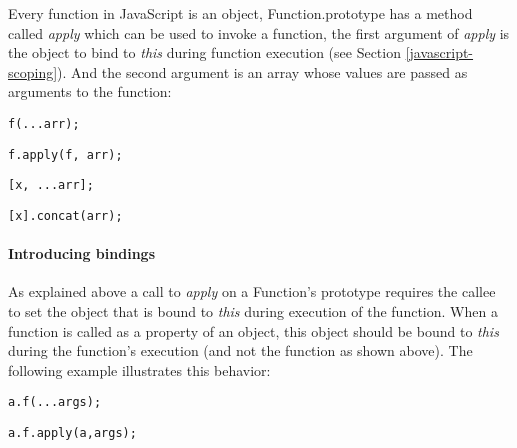 
Every function in JavaScript is an object, Function.prototype has a method called \textit{apply} which can be used to invoke a function, the first argument of \textit{apply} is the object to bind to \textit{this} during function execution (see Section \ref{javascript-scoping}). And the second argument is an array whose values are passed as arguments to the function:

\begin{minipage}{0.45\textwidth}
\begin{lstlisting}
f(...arr);
\end{lstlisting}
\end{minipage}
\hfill
\begin{minipage}{0.45\textwidth}
\begin{lstlisting}
f.apply(f, arr);
\end{lstlisting}
\end{minipage}

\begin{minipage}{0.45\textwidth}
\begin{lstlisting}
[x, ...arr];
\end{lstlisting}
\end{minipage}
\hfill
\begin{minipage}{0.45\textwidth}
\begin{lstlisting}
[x].concat(arr);
\end{lstlisting}
\end{minipage}

\paragraph{Introducing bindings} \label{spread-intoducing-bindings}
As explained above a call to \textit{apply} on a Function's prototype requires the callee to set the object that is bound to \textit{this} during execution of the function. When a function is called as a property of an object, this object should be bound to \textit{this} during the function's execution (and not the function as shown above). The following example illustrates this behavior:

\begin{lstlisting}
a.f(...args);
\end{lstlisting}
\begin{lstlisting}[caption={apply function with correct $this$ scope}]
a.f.apply(a,args);
\end{lstlisting}

